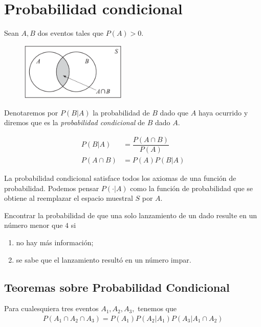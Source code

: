  \section{Probabilidad condicional}
{}
Sean $A,B$ dos eventos tales que $P(A)>0.$
\begin{figure}
	\centering
	\includegraphics[width=5cm,keepaspectratio=true]{./pe/pands0103.png}
	\label{pands0103}
\end{figure}

Denotaremos por $P(B|A)$
la probabilidad de $B$ dado que $A$ haya ocurrido y diremos que es la \emph{probabilidad condicional} de $B$ dado $A.$


\begin{defn}
	\begin{align}
		P(B|A)&=\dfrac{P(A\cap B)}{P(A)} \\
		P(A\cap B) &= P(A)P(B|A)
	\end{align}
\end{defn}


{}
\begin{rem}
	La probabilidad condicional satisface todos los axiomas de una función de probabilidad.  Podemos pensar $P(\cdot|A)$ como la función de probabilidad que se obtiene al reemplazar el espacio muestral $S$ por $A.$
\end{rem}


{}
\begin{ejemplo}
	\label{exmp:1.13}
	Encontrar la probabilidad de que una solo lanzamiento de un dado resulte en un número menor que $4$ si
	\begin{enumerate}
		\item no hay más información; 
		\item se sabe que el lanzamiento resultó en un número impar.
	\end{enumerate}
	
\end{ejemplo}


\subsection{Teoremas sobre Probabilidad Condicional}
{}
\begin{thm}
	\label{thm:1.9}
	Para cualesquiera tres eventos $A_{1},A_{2},A_{3},$ tenemos que
	\begin{align}
		\label{1.19}
		P(A_{1} \cap A_{2} \cap A_{3})=P(A_{1})P(A_{2}|A_{1})P(A_{3}|A_{1} \cap A_{2})
	\end{align}
\end{thm}


